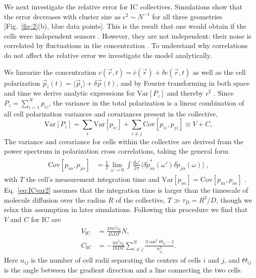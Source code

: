 We next investigate the relative error for IC collectives. Simulations show that the error decreases with cluster size as
$\epsilon^2 \sim N^{-1}$
for all three geometries [Fig.\ \ref{fig:2}(b), blue data points]. This is the result that one would obtain if the cells were independent sensors \cite{simons2004many}. However, they are not independent: their noise is correlated by fluctuations in the concentration \cite{fancher2016fundamental,mugler2016limits}. To understand why correlations do not affect the relative error we investigate the model analytically.

We linearize the concentration $c(\vec{r},t) = \bar{c}(\vec{r}) + \delta c(\vec{r},t)$ as well as the cell polarization
$\vec{p}_i(t) = \langle \vec{p}_i \rangle + \delta\vec{p}(t)$,
and by Fourier transforming in both space and time we derive analytic expressions for
$\text{Var}[P_z]$ and thereby $\epsilon^2$ \cite{supinfo}. Since
$P_z = \sum_{i=1}^N p_{iz}$,
the variance in the total polarization is a linear combination of all cell polarization variances and covariances present in the collective,
\begin{equation} \label{eq:ICvar1}
    \text{Var}[P_z] =
    \sum_{i} \text{Var}[p_{iz}]
    + \sum_{i\neq j} \text{Cov}[p_{iz},p_{jz}]
    \equiv V + C ,
\end{equation}
The variance and covariance for cells within the collective are derived from the power spectrum in polarization cross correlations, taking the general form
\begin{align} \label{eq:ICvar2}
\begin{split}
    \text{Cov}[p_{i\alpha},p_{j\alpha}] &= \frac{1}{T}
    \lim_{\omega \to 0} \int \frac{d\omega'}{2\pi}
    \langle\delta\tilde{p}_{i\alpha}^*(\omega')\delta\tilde{p}_{j\alpha}(\omega) \rangle
    \ ,
\end{split}
\end{align}
with $T$ the cell's measurement integration time and $\text{Var}[p_{i\alpha}] = \text{Cov}[p_{i\alpha},p_{i\alpha}]$ \cite{fancher2016fundamental,mugler2016limits,bialek2005physical}. Eq.\ \ref{eq:ICvar2} assumes that the integration time is larger than the timescale of molecule diffusion over the radius $R$ of the collective,
$T \gg \tau_D = R^2/D$, though we relax this assumption in later simulations.
Following this procedure we find that $V$ and $C$ for IC are \cite{supinfo}
\begin{align}
    V_\text{IC} &= \frac{4\pi a^5c_0}{45DT} N  \label{eq:ICV} , \\
    C_\text{IC} &= -\frac{\pi a^5c_0}{18DT} \sum_{i \neq j}^N \frac{3\cos^2\Theta_{ij}-1}{n^3_{ij}} . \label{eq:ICC}
\end{align}
Here
$n_{ij}$ %
is the number of cell radii separating the centers of cells $i$ and $j$, and $\Theta_{ij}$ is the angle between the gradient direction and a line connecting the two cells.

